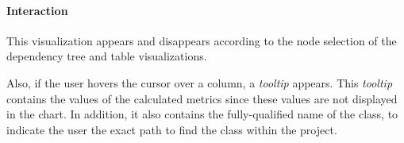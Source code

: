 \paragraph{Interaction}
This visualization appears and disappears according to the node selection of the dependency tree and table visualizations.

Also, if the user hovers the cursor over a column, a \textit{tooltip} appears. This \textit{tooltip} contains the values of the calculated metrics since these values are not displayed in the chart. In addition, it also contains the fully-qualified name of the class, to indicate the user the exact path to find the class within the project.
